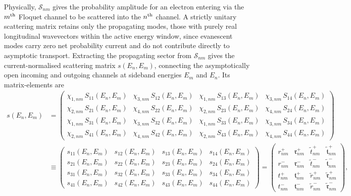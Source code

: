 \documentclass[aps,prb,onecolumn,longbibliography,nofootinbib,citeautoscript,10pt]{revtex4-2}
\def \nn{\nonumber \\}
\def\nn{\nonumber \\}
\def \nn{\nonumber \\}
\begin{document}
Physically, $\mathcal{S}_{nm}$ gives the probability amplitude for an electron entering via the $m^{\rm th}$ Floquet channel to be scattered into the $ n^{\rm th}$ channel. A strictly unitary scattering matrix retains only the propagating modes, those with purely real longitudinal wavevectors within the active energy window, since evanescent modes carry zero net probability current and do not contribute directly to asymptotic transport. Extracting the propagating sector from $\mathcal{S}_{nm}$ gives the current-normalised scattering matrix $s(E_n, E_m)$, connecting the asymptotically open incoming and outgoing channels at sideband energies $E_m$ and $E_n$. Its matrix-elements are
\begin{align}
s(E_n , E_m)  & =  
\begin{pmatrix} 
	\chi_{1,nm} \, S_{11}(E_n , E_m) & \chi_{3,nm} \, S_{12}(E_n , E_m) & 
	\chi_{1,nm} \, S_{13}(E_n , E_m) & \chi_{3,nm} \, S_{14}(E_n , E_m) \\ 
	\chi_{2,nm} \, S_{21}(E_n , E_m) & \chi_{4,nm} \, S_{22}(E_n , E_m) & 
	\chi_{2,nm} \, S_{23}(E_n , E_m) & \chi_{4,nm} \, S_{24}(E_n , E_m) \\ 
	\chi_{1,nm} \, S_{31}(E_n , E_m) & \chi_{3,nm} \, S_{32}(E_n , E_m) & 
	\chi_{1,nm} \, S_{33}(E_n , E_m) & \chi_{3,nm} \, S_{34}(E_n , E_m) \\ 
	\chi_{2,nm} \, S_{41}(E_n , E_m) & \chi_{4,nm} \, S_{42}(E_n , E_m) & 
	\chi_{2,nm} \, S_{43}(E_n , E_m) & \chi_{4,nm} \, S_{44}(E_n , E_m)
\end{pmatrix} \nn & \equiv 
\begin{pmatrix} 
	s_{11}(E_n , E_m) & s_{12}(E_n , E_m) & s_{13}(E_n , E_m) & s_{14}(E_n , E_m) \\ 
	s_{21}(E_n , E_m) & s_{22}(E_n , E_m) & s_{23}(E_n , E_m) & s_{24}(E_n , E_m) \\ 
	s_{31}(E_n , E_m) & s_{32}(E_n , E_m) & s_{33}(E_n , E_m) & s_{34}(E_n , E_m) \\ 
	s_{41}(E_n , E_m) & s_{42}(E_n , E_m) & s_{43}(E_n , E_m) & s_{44}(E_n , E_m)
\end{pmatrix}  =  
\begin{pmatrix} 
	r_{nm}^{+} & \mathfrak{r}_{nm}^{+} & \tilde{t}_{nm}^{+} & \tilde{\mathfrak{t}}_{nm}^{+} \\ 
	r_{nm}^{-} & \mathfrak{r}_{nm}^{-} & \tilde{t}_{nm}^{-} & \tilde{\mathfrak{t}}_{nm}^{-} \\ 
	t_{nm}^{+} & \mathfrak{t}_{nm}^{+} & \tilde{r}_{nm}^{+} & \tilde{\mathfrak{r}}_{nm}^{+} \\ 
	t_{nm}^{-} & \mathfrak{t}_{nm}^{-} & \tilde{r}_{nm}^{-} & \tilde{\mathfrak{r}}_{nm}^{-}
\end{pmatrix} , 
\label{eq:unitary_s_matriX_elements}
\end{align}
\end{document}
